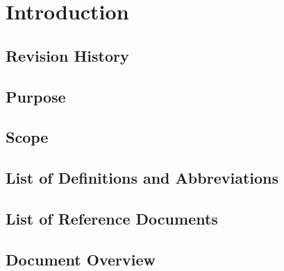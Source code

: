 \chapter{Introduction} \label{chap1}

\section{Revision History}

\section{Purpose}

\section{Scope}

\section{List of Definitions and Abbreviations}

\section{List of Reference Documents}

\section{Document Overview}